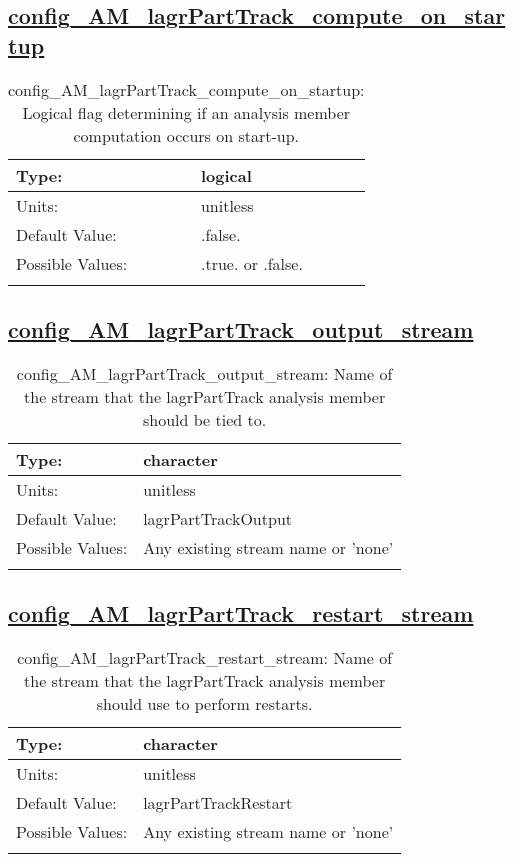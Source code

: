 \subsection[config\_AM\_lagrPartTrack\_compute\_on\_startup]{\hyperref[sec:nm_tab_AM_lagrPartTrack]{config\_AM\_lagrPartTrack\_compute\_on\_startup}}
\label{subsec:nm_sec_config_AM_lagrPartTrack_compute_on_startup}
\begin{center}
\begin{longtable}{| p{2.0in} || p{4.0in} |}
    \hline
    Type: & logical \\
    \hline
    Units: & \si{unitless} \\
    \hline
    Default Value: & .false. \\
    \hline
    Possible Values: & .true. or .false. \\
    \hline
    \caption{config\_AM\_lagrPartTrack\_compute\_on\_startup: Logical flag determining if an analysis member computation occurs on start-up.}
\end{longtable}
\end{center}
\subsection[config\_AM\_lagrPartTrack\_output\_stream]{\hyperref[sec:nm_tab_AM_lagrPartTrack]{config\_AM\_lagrPartTrack\_output\_stream}}
\label{subsec:nm_sec_config_AM_lagrPartTrack_output_stream}
\begin{center}
\begin{longtable}{| p{2.0in} || p{4.0in} |}
    \hline
    Type: & character \\
    \hline
    Units: & \si{unitless} \\
    \hline
    Default Value: & lagrPartTrackOutput \\
    \hline
    Possible Values: & Any existing stream name or 'none' \\
    \hline
    \caption{config\_AM\_lagrPartTrack\_output\_stream: Name of the stream that the lagrPartTrack analysis member should be tied to.}
\end{longtable}
\end{center}
\subsection[config\_AM\_lagrPartTrack\_restart\_stream]{\hyperref[sec:nm_tab_AM_lagrPartTrack]{config\_AM\_lagrPartTrack\_restart\_stream}}
\label{subsec:nm_sec_config_AM_lagrPartTrack_restart_stream}
\begin{center}
\begin{longtable}{| p{2.0in} || p{4.0in} |}
    \hline
    Type: & character \\
    \hline
    Units: & \si{unitless} \\
    \hline
    Default Value: & lagrPartTrackRestart \\
    \hline
    Possible Values: & Any existing stream name or 'none' \\
    \hline
    \caption{config\_AM\_lagrPartTrack\_restart\_stream: Name of the stream that the lagrPartTrack analysis member should use to perform restarts.}
\end{longtable}
\end{center}
